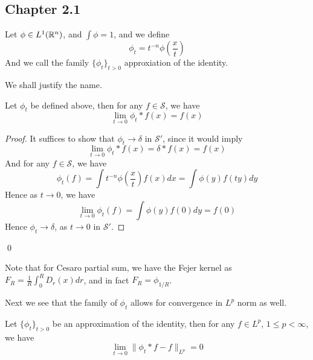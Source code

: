 \subsection{Chapter 2.1}
\begin{definition}
    Let $\phi\in L^1(\mathbb{R}^n)$, and $\int\phi=1$, and we define 
    \begin{equation*}
        \phi_t=t^{-n}\phi\left(\frac{x}{t} \right)
    \end{equation*} 
    And we call the family $\{\phi_t\}_{t>0}$ approxiation of the identity.
\end{definition}
We shall justify the name.
\begin{proposition}
    Let $\phi_t$ be defined above, then for any $f\in\mathcal{S}$, we have
    \begin{equation*}
        \lim_{t\to 0}\phi_t\ast f(x)=f(x)
    \end{equation*}
\end{proposition}
\begin{proof}
    It suffices to show that $\phi_t\to\delta$ in $\mathcal{S}'$, since it would imply
    \begin{equation*}
        \lim_{t\to 0}\phi_t\ast f(x)=\delta\ast f(x)=f(x)
    \end{equation*}
    And for any $f\in\mathcal{S}$, we have
    \begin{equation*}
        \phi_t(f)=\int t^{-n}\phi\left(\frac{x}{t}\right)f(x)dx=\int \phi(y)f(ty)dy
    \end{equation*}
    Hence as $t\to 0$, we have
    \begin{equation*}
        \lim_{t\to 0}\phi_t(f)=\int\phi(y)f(0)dy=f(0)
    \end{equation*}
    Hence $\phi_t\to\delta$, as $t\to 0$ in $\mathcal{S}'$.
\end{proof}
\qed

\begin{remark}
    Note that for Cesaro partial sum, we have the Fejer kernel as $F_R=\frac{1}{R}\int_0^R D_r(x)dr$, and in fact $F_R=\phi_{1/R}$.
\end{remark}
Next we see that the family of $\phi_t$ allows for convergence in $L^p$ norm as well.
\begin{theorem}
    Let $\{\phi_t\}_{t>0}$ be an approximation of the identity, then for any $f\in L^p$, $1\leq p<\infty$, we have
    \begin{equation*}
        \lim_{t\to 0}\|\phi_t\ast f-f\|_{L^p}=0
    \end{equation*}
\end{theorem}




